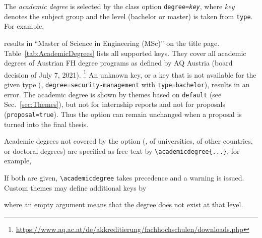 \documentclass[language=english]{hgbarticle}
\begin{document}
The \emph{academic degree} is selected by the class option \texttt{degree=\textit{key}}, where
\textit{key} denotes the subject group and the level (bachelor or master) is taken from
\texttt{type}. For example,
%
%
results in ``Master of Science in Engineering (MSc)'' on the title page.
Table~\ref{tab:AcademicDegrees} lists all supported keys. They cover all academic degrees of
Austrian FH degree programs as defined by AQ Austria (board decision of July 7, 2021).%
\footnote{\url{https://www.aq.ac.at/de/akkreditierung/fachhochschulen/downloads.php}}
An unknown key, or a key that is not available for the given type (\eg, \texttt{degree=security-management}
with \texttt{type=bachelor}), results in an error.
The academic degree is shown by themes based on \texttt{default} (see Sec.~\ref{sec:Themes}),
but not for internship reports and not for proposals (\texttt{proposal=true}). Thus the option can
remain unchanged when a proposal is turned into the final thesis.

Academic degrees not covered by the option (\eg, of universities, of other countries, or doctoral
degrees) are specified as free text by \verb!!, for example,
%
\begin{LaTeXCode}[numbers=none]
\end{LaTeXCode}
%
If both are given, \verb!\academicdegree! takes precedence and a warning is issued.
Custom themes may define additional keys by
%
\begin{LaTeXCode}[numbers=none]
\end{LaTeXCode}
%
where an empty argument means that the degree does not exist at that level.
\end{document}
